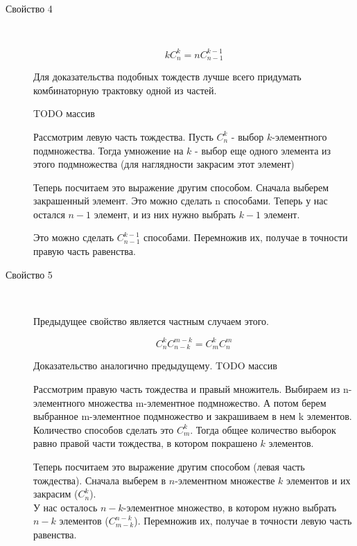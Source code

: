 \begin{description}
\item[Свойство 4]~	

$$
k C_n^k  = n C_{n-1}^{k-1}
$$

Для доказательства подобных тождеств лучше всего придумать комбинаторную трактовку одной из частей.

TODO массив

Рассмотрим левую часть тождества.
Пусть $C_n^k$ - выбор $k$-элементного подмножества.
Тогда умножение на $ k $ - выбор еще одного элемента из этого подмножества 
(для наглядности закрасим этот элемент)

Теперь посчитаем это выражение другим способом.
Сначала выберем закрашенный элемент. Это можно сделать n способами.
Теперь у нас остался $ n-1 $ элемент, и из них нужно выбрать $ k-1 $ элемент.

Это можно сделать $C_{n-1}^{k-1}$ способами.
Перемножив их, получае в точности правую часть равенства.

\end{description}


\begin{description}
\item[Свойство 5]~	

Предыдущее свойство является частным случаем этого.

$$
C_n^k C_{n-k}^{m-k} = C_m^k C_n^m
$$

Доказательство аналогично предыдущему.
TODO массив

Рассмотрим правую часть тождества и правый множитель.
Выбираем из n-элементного множества m-элементное подмножество.
А потом берем выбранное m-элементное подмножество и закрашиваем в нем k элементов.
Количество способов сделать это $C_m^k$.
Тогда общее количество выборок равно правой части тождества, в котором покрашено $ k $ элементов.

Теперь посчитаем это выражение другим способом (левая часть тождества).
Сначала выберем в $n$-элементном множестве $ k $ элементов и их закрасим ($C_n^k$). \\
У нас осталось $n-k$-элементное множество, 
в котором нужно выбрать $ n-k $ элементов ($C_{m-k}^{n-k}$).
Перемножив их, получае в точности левую часть равенства.

\end{description}


